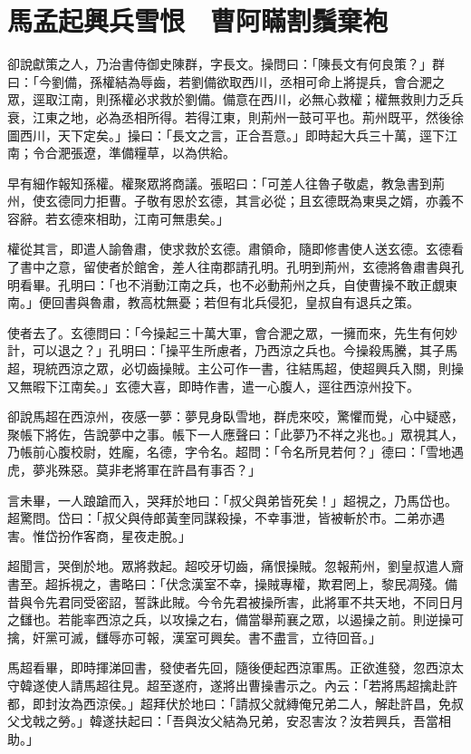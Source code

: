 
\chapter{馬孟起興兵雪恨　曹阿瞞割鬚棄袍}

卻說獻策之人，乃治書侍御史陳群，字長文。操問曰：「陳長文有何良策？」群曰：「今劉備，孫權結為辱齒，若劉備欲取西川，丞相可命上將提兵，會合淝之眾，逕取江南，則孫權必求救於劉備。備意在西川，必無心救權；權無救則力乏兵衰，江東之地，必為丞相所得。若得江東，則荊州一鼓可平也。荊州既平，然後徐圖西川，天下定矣。」操曰：「長文之言，正合吾意。」即時起大兵三十萬，逕下江南；令合淝張遼，準備糧草，以為供給。

早有細作報知孫權。權聚眾將商議。張昭曰：「可差人往魯子敬處，教急書到荊州，使玄德同力拒曹。子敬有恩於玄德，其言必從；且玄德既為東吳之婿，亦義不容辭。若玄德來相助，江南可無患矣。」

權從其言，即遣人諭魯肅，使求救於玄德。肅領命，隨即修書使人送玄德。玄德看了書中之意，留使者於館舍，差人往南郡請孔明。孔明到荊州，玄德將魯肅書與孔明看畢。孔明曰：「也不消動江南之兵，也不必動荊州之兵，自使曹操不敢正覷東南。」便回書與魯肅，教高枕無憂；若但有北兵侵犯，皇叔自有退兵之策。

使者去了。玄德問曰：「今操起三十萬大軍，會合淝之眾，一擁而來，先生有何妙計，可以退之？」孔明曰：「操平生所慮者，乃西涼之兵也。今操殺馬騰，其子馬超，現統西涼之眾，必切齒操賊。主公可作一書，往結馬超，使超興兵入關，則操又無暇下江南矣。」玄德大喜，即時作書，遣一心腹人，逕往西涼州投下。

卻說馬超在西涼州，夜感一夢：夢見身臥雪地，群虎來咬，驚懼而覺，心中疑惑，聚帳下將佐，告說夢中之事。帳下一人應聲曰：「此夢乃不祥之兆也。」眾視其人，乃帳前心腹校尉，姓龐，名德，字令名。超問：「令名所見若何？」德曰：「雪地遇虎，夢兆殊惡。莫非老將軍在許昌有事否？」

言未畢，一人踉蹌而入，哭拜於地曰：「叔父與弟皆死矣！」超視之，乃馬岱也。超驚問。岱曰：「叔父與侍郎黃奎同謀殺操，不幸事泄，皆被斬於市。二弟亦遇害。惟岱扮作客商，星夜走脫。」

超聞言，哭倒於地。眾將救起。超咬牙切齒，痛恨操賊。忽報荊州，劉皇叔遣人齎書至。超拆視之，書略曰：「伏念漢室不幸，操賊專權，欺君罔上，黎民凋殘。備昔與令先君同受密詔，誓誅此賊。今令先君被操所害，此將軍不共天地，不同日月之讎也。若能率西涼之兵，以攻操之右，備當舉荊襄之眾，以遏操之前。則逆操可擒，奸黨可滅，讎辱亦可報，漢室可興矣。書不盡言，立待回音。」

馬超看畢，即時揮涕回書，發使者先回，隨後便起西涼軍馬。正欲進發，忽西涼太守韓遂使人請馬超往見。超至遂府，遂將出曹操書示之。內云：「若將馬超擒赴許都，即封汝為西涼侯。」超拜伏於地曰：「請叔父就縳俺兄弟二人，解赴許昌，免叔父戈戟之勞。」韓遂扶起曰：「吾與汝父結為兄弟，安忍害汝？汝若興兵，吾當相助。」

